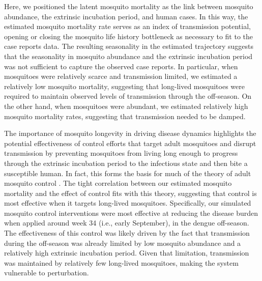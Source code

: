 \documentclass[10pt,letterpaper]{article}
\begin{document}
Here, we positioned the latent mosquito mortality as the link between mosquito abundance, the extrinsic incubation period, and human cases.
In this way, the estimated mosquito mortality rate serves as an index of transmission potential, opening or closing the mosquito life history bottleneck \cite{Smith2012} as necessary to fit to the case reports data.
The resulting seasonality in the estimated trajectory suggests that the seasonality in mosquito abundance and the extrinsic incubation period was not sufficient to capture the observed case reports.
In particular, when mosquitoes were relatively scarce and transmission limited, we estimated a  relatively low mosquito mortality, suggesting that long-lived mosquitoes were required to maintain observed levels of transmission through the off-season.  
On the other hand, when mosquitoes were abundant, we estimated relatively high mosquito mortality rates, suggesting that transmission needed to be damped.

The importance of mosquito longevity in driving disease dynamics highlights the potential effectiveness of control efforts that target adult mosquitoes and disrupt transmission by preventing mosquitoes from living long enough to progress through the extrinsic incubation period to the infectious state and then bite a susceptible human.
In fact, this forms the basis for much of the theory of adult mosquito control \cite{Burattini2008, Morrison2008, Smith2012}.
The tight correlation between our estimated mosquito mortality and the effect of control fits with this theory, suggesting that control is most effective when it targets long-lived mosquitoes.  
Specifically, our simulated mosquito control interventions were most effective at reducing the disease burden when applied around week 34 (i.e., early September), in the dengue off-season.
The effectiveness of this control was likely driven by the fact that transmission during the off-season was already limited by low mosquito abundance and a relatively high extrinsic incubation period.
Given that limitation, transmission was maintained by relatively few long-lived mosquitoes, making the system vulnerable to perturbation.
\end{document}
